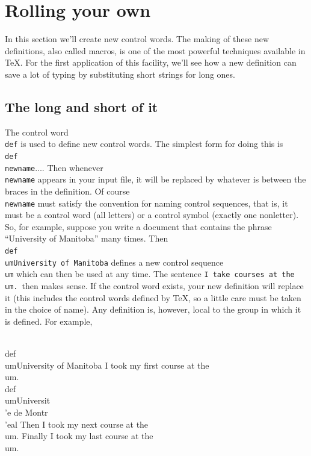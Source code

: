 \section{Rolling your own} 

In this section we'll create new control words.  The making of 
these new definitions, also called macros, is one of the most 
powerful techniques available in \TeX\null.  For the first 
application of this facility, we'll see how a new definition can 
save a lot of typing by substituting short strings for long ones. 

\subsection{The long and short of it} 

The control word {\tt \\def} is used to define new control words. 
The simplest form for doing this is {\tt \\def\\newname\lb$\ldots$\rb}. 
Then whenever {\tt \\newname} appears in your 
input file, it will be replaced by whatever is between the braces 
in the definition.  Of course {\tt \\newname} must satisfy the 
convention for naming control sequences, that is, it must be a 
control word (all letters) or a control symbol (exactly one 
nonletter). So, for example, suppose you write a document that 
contains the phrase ``University of Manitoba'' many times.  Then 
{\tt \\def\\um\lb University of Manitoba\rb} defines a new 
control sequence {\tt \\um} which can then be used at any time. 
The sentence {\tt I take courses at the \\um.}\ then makes 
sense. If the control word exists, your new definition will 
replace it (this includes the control words defined by \TeX{}, so 
a little care must be taken in the choice of name). Any 
definition is, however,  local to the group in which it is 
defined.  For example,  

\beginuser 
\\def\\um\lb University of Manitoba\rb 
I took my first course at the \\um. 
\lb 
\\def\\um\lb Universit\\'e de Montr\\'eal\rb 
Then I took my next course at the \\um. 
\rb 
Finally I took my last course at the \\um. 
\enduser 

